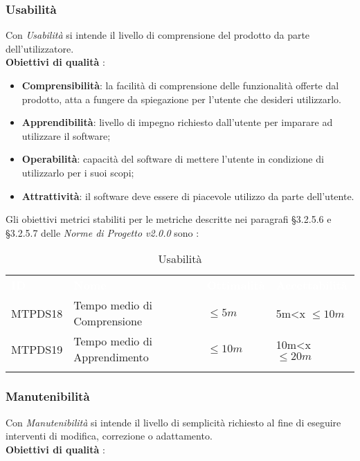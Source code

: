 \fi


\subsubsection{Usabilità}

Con \textit{Usabilità} si intende il livello di comprensione del prodotto da parte dell'utilizzatore.\\
\textbf{Obiettivi di qualità} :

\begin{itemize}
	\item \textbf{Comprensibilità}: la facilità di comprensione delle funzionalità offerte dal prodotto, atta a fungere da spiegazione per l'utente che desideri utilizzarlo. 
	\item \textbf{Apprendibilità}: livello di impegno richiesto dall'utente per imparare ad utilizzare il software;
	\item \textbf{Operabilità}: capacità del software di mettere l'utente in condizione di utilizzarlo per i suoi scopi; 
	\item \textbf{Attrattività}: il software deve essere di piacevole utilizzo da parte dell'utente.
\end{itemize}

Gli obiettivi metrici stabiliti per le metriche descritte nei paragrafi §3.2.5.6 e §3.2.5.7 delle \textit{Norme di Progetto v2.0.0} sono : 

\begin{longtable}{|C{.15\textwidth}|C{.24\textwidth}|C{.24\textwidth}|C{.24\textwidth}|}
\hline
{}\textbf{\textcolor{white}{ID}} & \textbf{\textcolor{white}{Nome}} & \textbf{\textcolor{white}{Ottimalità}} & \textbf{\textcolor{white}{Accettabilità}}\\
MTPDS18 & Tempo medio di Comprensione & $\leq 5m$ & 5m<x $\leq 10m$\\
\hline
{}MTPDS19 & Tempo medio di Apprendimento & $\leq 10m$ & 10m<x $\leq 20m$ \\ 
\hline
\caption{Usabilità}
\label{Usabilità}
\end{longtable}

\subsubsection{Manutenibilità}

Con \textit{Manutenibilità} si intende il livello di semplicità richiesto al fine di eseguire interventi di modifica, correzione o adattamento.\\
\textbf{Obiettivi di qualità} :

